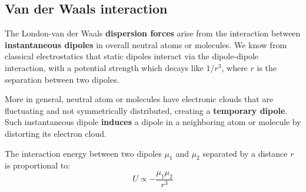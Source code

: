 \documentclass[
  letterpaper,
  enabledeprecatedfontcommands]{report}
\begin{document}
\subsection{Van der Waals interaction}\label{van-der-waals-interaction}

The London-van der Waals \textbf{dispersion forces} arise from the
interaction between \textbf{instantaneous dipoles} in overall neutral
atoms or molecules. We know from classical electrostatics that static
dipoles interact via the dipole-dipole interaction, with a potential
strength which decays like \(1/r^3\), where \(r\) is the separation
between two dipoles.

More in general, neutral atom or molecules have electronic clouds that
are fluctuating and not symmetrically distributed, creating a
\textbf{temporary dipole}. Such instantaneous dipole \textbf{induces} a
dipole in a neighboring atom or molecule by distorting its electron
cloud.

The interaction energy between two dipoles \(\mu_1\) and \(\mu_2\)
separated by a distance \(r\) is proportional to: \[
U \propto -\frac{\mu_1 \mu_2}{r^3}
\]
\end{document}
